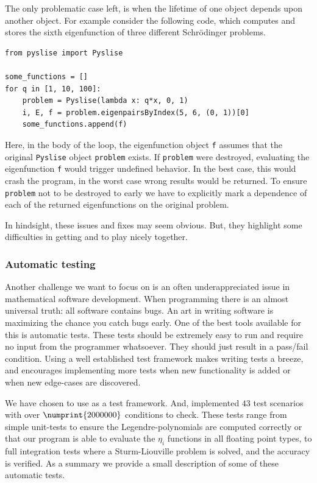 The only problematic case left, is when the lifetime of one object depends upon another object. For example consider the following \lpython{} code, which computes and stores the sixth eigenfunction of three different Schrödinger problems.
\begin{verbatim}
from pyslise import Pyslise

some_functions = []
for q in [1, 10, 100]:
    problem = Pyslise(lambda x: q*x, 0, 1)
    i, E, f = problem.eigenpairsByIndex(5, 6, (0, 1))[0]
    some_functions.append(f)
\end{verbatim}
Here, in the body of the loop, the eigenfunction object \texttt{f} assumes that the original \texttt{Pyslise} object \texttt{problem} exists. If \texttt{problem} were destroyed, evaluating the eigenfunction \texttt{f} would trigger undefined behavior. In the best case, this would crash the program, in the worst case wrong results would be returned. To ensure \texttt{problem} not to be destroyed to early we have to explicitly mark a dependence of each of the returned eigenfunctions on the original problem.

In hindsight, these issues and fixes may seem obvious. But, they highlight some difficulties in getting \lpython{} and \cpp{} to play nicely together.

\subsubsection{Automatic testing}

Another challenge we want to focus on is an often underappreciated issue in mathematical software development. When programming there is an almost universal truth: all software contains bugs. An art in writing software is maximizing the chance you catch bugs early. One of the best tools available for this is automatic tests. These tests should be extremely easy to run and require no input from the programmer whatsoever. They should just result in a pass/fail condition. Using a well established test framework makes writing tests a breeze, and encourages implementing more tests when new functionality is added or when new edge-cases are discovered.

We have chosen to use \catch{} \cite{_catchorg_2023} as a test framework. And, implemented $43$ test scenarios with over $\numprint{2000000}$ conditions to check. These tests range from simple unit-tests to ensure the Legendre-polynomials are computed correctly or that our program is able to evaluate the $\eta_i$ functions in all floating point types, to full integration tests where a Sturm-Liouville problem is solved, and the accuracy is verified. As a summary we provide a small description of some of these automatic tests.

